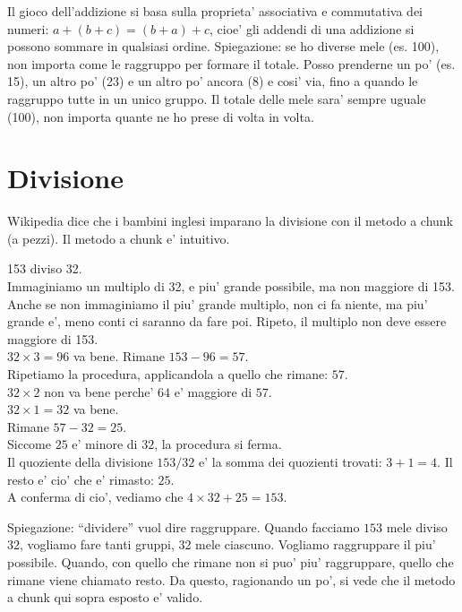 \documentclass[a4paper]{article}
\begin{document}
Il gioco dell'addizione si basa sulla proprieta' associativa e commutativa dei numeri: $a+(b+c)=(b+a)+c$, cioe' gli addendi di una addizione si possono sommare in qualsiasi ordine. Spiegazione: se ho diverse mele (es. 100), non importa come le raggruppo per formare il totale. Posso prenderne un po' (es. 15), un altro po' (23) e un altro po' ancora (8) e cosi' via, fino a quando le raggruppo tutte in un unico gruppo. Il totale delle mele sara' sempre uguale (100), non importa quante ne ho prese di volta in volta.


\section{Divisione}

Wikipedia dice che i bambini inglesi imparano la divisione con il metodo a chunk (a pezzi). Il metodo a chunk e' intuitivo.

\begin{exemp}
	153 diviso 32.\\
	Immaginiamo un multiplo di 32, e piu' grande possibile, ma non maggiore di 153. Anche se non immaginiamo il piu' grande multiplo, non ci fa niente, ma piu' grande e', meno conti ci saranno da fare poi. Ripeto, il multiplo non deve essere maggiore di 153.\\
	$32\times 3 = 96$ va bene.
	Rimane $153 - 96 = 57$.\\
	Ripetiamo la procedura, applicandola a quello che rimane: $57$.\\
	$32 \times 2$ non va bene perche' $64$ e' maggiore di $57$.\\
	$32 \times 1 = 32$ va bene.\\
	Rimane $57-32=25$.\\
	Siccome $25$ e' minore di $32$, la procedura si ferma.\\
	Il quoziente della divisione $153 / 32$ e' la somma dei quozienti trovati: $3+1=4$. Il resto e' cio' che e' rimasto: $25$.\\
	A conferma di cio', vediamo che $4\times 32 + 25 = 153$.	
\end{exemp}

Spiegazione: ``dividere'' vuol dire raggruppare. Quando facciamo $153$ mele diviso $32$, vogliamo fare tanti gruppi, 32 mele ciascuno. Vogliamo raggruppare il piu' possibile. Quando, con quello che rimane non si puo' piu' raggruppare, quello che rimane viene chiamato resto. Da questo, ragionando un po', si vede che il metodo a chunk qui sopra esposto e' valido.
\end{document}
